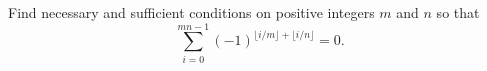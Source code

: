 Find necessary and sufficient conditions on positive integers $m$ and $n$
so that
\[\sum_{i=0}^{mn-1} (-1)^{\lfloor i/m \rfloor +\lfloor i/n\rfloor}=0.\]
